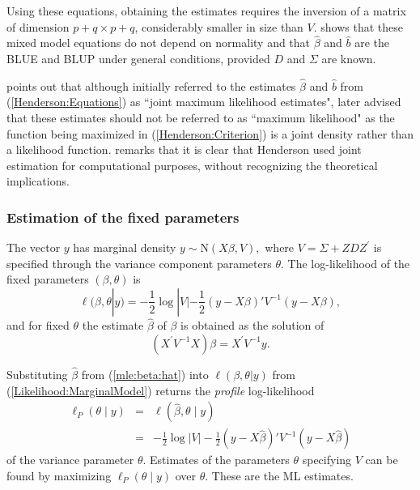 \documentclass[12pt, a4paper]{report}
\theoremstyle{plain}
\theoremstyle{definition}
\theoremstyle{remark}
\begin{document}
			Using these equations, obtaining the estimates requires the inversion of a matrix
			of dimension $p+q \times p+q$, considerably smaller in size than $V$. \citet{Henderson63} shows that these mixed model equations do not depend on normality and that $\hat{\beta}$ and $\hat{b}$ are the BLUE and BLUP under general conditions, provided $D$ and $\Sigma$ are known.
			
			\cite{Robi:BLUP:1991} points out that although \cite{Henderson:1950} initially referred to the estimates $\hat{\beta}$ and $\hat{b}$ from (\ref{Henderson:Equations}) as ``joint maximum likelihood estimates", \cite{Henderson:1973} later advised that these estimates should not be referred to as ``maximum likelihood" as the function being maximized in (\ref{Henderson:Criterion}) is a joint density rather than a likelihood function. \cite{YLee} remarks that it is clear that Henderson used joint estimation for computational purposes, without recognizing the theoretical implications.
			
			
			
			
			
			
			
			
			\subsubsection{Estimation of the fixed parameters}
			
			The vector $y$ has marginal density $y \sim \mathrm{N}(X \beta,V),$ where $V = \Sigma + ZDZ^\prime$ is specified through the variance component parameters $\theta.$ The log-likelihood of the fixed parameters $(\beta, \theta)$ is
			\begin{equation}
			\ell (\beta, \theta|y) =
			-\frac{1}{2} \log |V| -\frac{1}{2}(y -
			X \beta)'V^{-1}(y -
			X \beta), \label{Likelihood:MarginalModel}
			\end{equation}
			and for fixed $\theta$ the estimate $\hat{\beta}$ of $\beta$ is obtained as the solution of
			\begin{equation}
			(X^\prime V^{-1}X) {\beta} = X^\prime V^{-1}y.
			\label{mle:beta:hat}
			\end{equation}
			
			Substituting $\hat{\beta}$ from (\ref{mle:beta:hat}) into $\ell(\beta, \theta|y)$ from (\ref{Likelihood:MarginalModel}) returns the \emph{profile} log-likelihood
			\begin{eqnarray*}
				\ell_P(\theta \mid y) &=& \ell(\hat{\beta}, \theta \mid y) \\
				&=& -\frac{1}{2} \log |V| -\frac{1}{2}(y - X \hat{\beta})'V^{-1}(y - X \hat{\beta})
			\end{eqnarray*}
			of the variance parameter $\theta.$ Estimates of the parameters $\theta$ specifying $V$ can be found by maximizing $\ell_P(\theta \mid y)$ over $\theta.$ These are the ML estimates.
			
\end{document}
